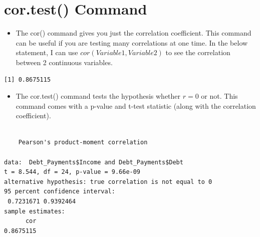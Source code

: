 \documentclass[
  letterpaper,
  DIV=11,
  numbers=noendperiod]{scrreprt}
\newenvironment{Shaded}{\begin{snugshade}}{\end{snugshade}}
\newcommand{\FunctionTok}[1]{\textcolor[rgb]{0.28,0.35,0.67}{#1}}
\newcommand{\NormalTok}[1]{\textcolor[rgb]{0.00,0.23,0.31}{#1}}
\newcommand{\SpecialCharTok}[1]{\textcolor[rgb]{0.37,0.37,0.37}{#1}}
\providecommand{\tightlist}{%
  \setlength{\itemsep}{0pt}\setlength{\parskip}{0pt}}\usepackage{longtable,booktabs,array}
\begin{document}
\section{cor.test() Command}\label{cor.test-command}

\begin{itemize}
\tightlist
\item
  The cor() command gives you just the correlation coefficient. This
  command can be useful if you are testing many correlations at one
  time. In the below statement, I can use \(cor(Variable1, Variable2)\)
  to see the correlation between 2 continuous variables.
\end{itemize}

\begin{Shaded}
\end{Shaded}

\begin{verbatim}
[1] 0.8675115
\end{verbatim}

\begin{itemize}
\tightlist
\item
  The cor.test() command tests the hypothesis whether \(r=0\) or not.
  This command comes with a p-value and t-test statistic (along with the
  correlation coefficient).
\end{itemize}

\begin{Shaded}
\end{Shaded}

\begin{verbatim}

    Pearson's product-moment correlation

data:  Debt_Payments$Income and Debt_Payments$Debt
t = 8.544, df = 24, p-value = 9.66e-09
alternative hypothesis: true correlation is not equal to 0
95 percent confidence interval:
 0.7231671 0.9392464
sample estimates:
      cor 
0.8675115 
\end{verbatim}
\end{document}
